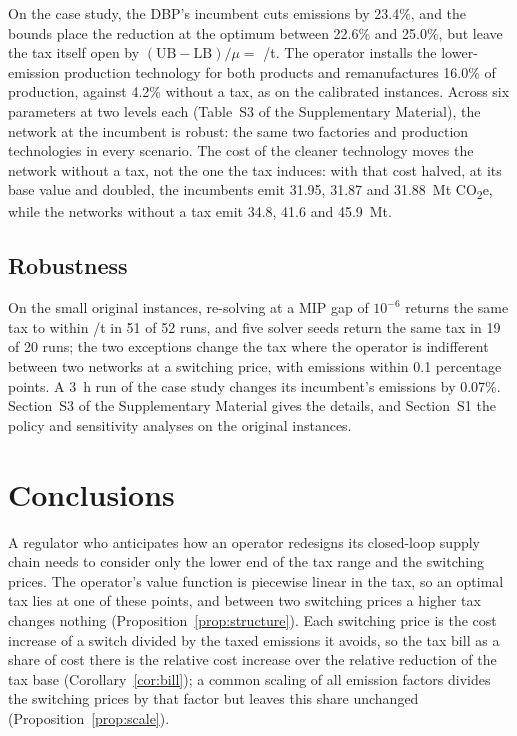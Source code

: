\documentclass[review,11pt,nonatbib]{elsarticle}
\theoremstyle{remark}
\newcommand{\EUR}{\texteuro}
\newcommand{\CO}{CO\textsubscript{2}e}
\begin{document}
On the case study, the DBP's incumbent cuts emissions by 23.4\%, and the bounds place the reduction at the optimum between 22.6\% and 25.0\%, but leave the tax itself open by $(\mathrm{UB} - \mathrm{LB})/\mu = $ \EUR125/t. The operator installs the lower-emission production technology for both products and remanufactures 16.0\% of production, against 4.2\% without a tax, as on the calibrated instances. Across six parameters at two levels each (Table~S3 of the Supplementary Material), the network at the incumbent is robust: the same two factories and production technologies in every scenario. The cost of the cleaner technology moves the network without a tax, not the one the tax induces: with that cost halved, at its base value and doubled, the incumbents emit 31.95, 31.87 and 31.88~Mt \CO, while the networks without a tax emit 34.8, 41.6 and 45.9~Mt.

\subsection{Robustness}\label{sec:robustness}

On the small original instances, re-solving at a MIP gap of $10^{-6}$ returns the same tax to within \EUR0.05/t in 51 of 52 runs, and five solver seeds return the same tax in 19 of 20 runs; the two exceptions change the tax where the operator is indifferent between two networks at a switching price, with emissions within 0.1 percentage points. A 3~h run of the case study changes its incumbent's emissions by 0.07\%. Section~S3 of the Supplementary Material gives the details, and Section~S1 the policy and sensitivity analyses on the original instances.

\section{Conclusions}\label{sec:conclusions}

A regulator who anticipates how an operator redesigns its closed-loop supply chain needs to consider only the lower end of the tax range and the switching prices. The operator's value function is piecewise linear in the tax, so an optimal tax lies at one of these points, and between two switching prices a higher tax changes nothing (Proposition~\ref{prop:structure}). Each switching price is the cost increase of a switch divided by the taxed emissions it avoids, so the tax bill as a share of cost there is the relative cost increase over the relative reduction of the tax base (Corollary~\ref{cor:bill}); a common scaling of all emission factors divides the switching prices by that factor but leaves this share unchanged (Proposition~\ref{prop:scale}).
\end{document}
